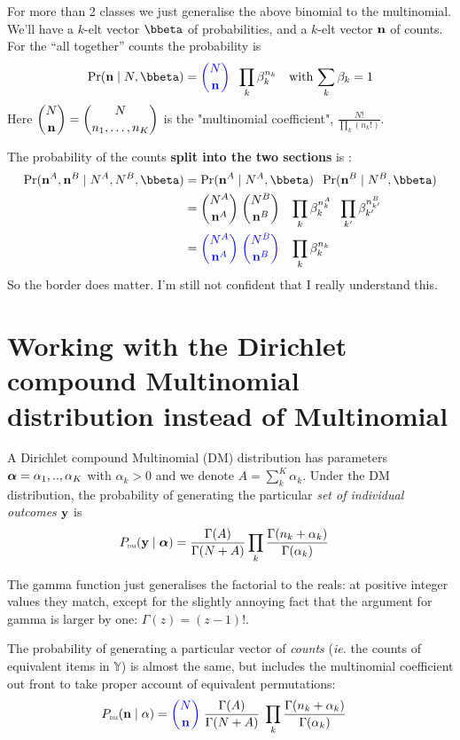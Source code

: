 \documentclass[12pt]{article}
\begin{document}
For more than 2 classes we just generalise the above binomial to the
multinomial.  We'll have a $k$-elt vector $\bbeta$ of probabilities,
and a $k$-elt vector $\mathbf{n}$ of counts.  For the ``all together'' counts
the probability is
\begin{align*}
\Pr(\bn \mid N,\bbeta) &= {\color{blue}{N \choose \bn}} \;\; \prod_k \beta_k^{n_k}
& \text{with $\displaystyle \sum_k \beta_k  = 1$}
\end{align*}
Here $\displaystyle {N \choose \ensuremath{\mathbf{n}}} = {N \choose n_1,\ldots,n_K}
$ is the "multinomial coefficient", $\displaystyle \frac{N!}{\prod_k (n_k!)}$.

The probability of the counts {\bf split into the two sections} is :
\begin{align}
  \Pr(\bn^A, \bn^B\mid N^A,N^B,\bbeta) &= 
  \Pr(\bn^A \mid N^A,\bbeta) \;\;\Pr(\bn^B \mid N^B,\bbeta) \nonumber \\
&= 
{N^A \choose \bn^A}  \; {N^B \choose \bn^B} \;\;\; \prod_k \beta_k^{n^A_k} \;\; \prod_{k^\prime} \beta_{k^\prime}^{n^B_{k^\prime}} \nonumber \\
&= 
{\color{blue} {N^A \choose \bn^A}  \; {N^B \choose \bn^B}} \;\;\; \prod_k \beta_k^{n_k} \label{eq:multinomial-split}
\end{align}
{\color{red} So the border does matter. I'm still not confident that I really understand this.}

\section{Working with the Dirichlet compound Multinomial distribution instead of Multinomial}
A Dirichlet compound Multinomial (DM) distribution has parameters
$\boldsymbol\alpha = \alpha_1,..,\alpha_K$ with $\alpha_k > 0$ and we denote $ A
= \sum_k^K \alpha_k$. Under the DM distribution, the probability of
generating the particular {\it set of individual outcomes}
$\mathbf{y}$ is
\begin{align}
P_\text{\tiny\sc dm}(\mathbf{y} \mid\boldsymbol\alpha) &= \frac{\Gamma(A)}{\Gamma(N+A)} \prod_k \frac{\Gamma(n_k+\alpha_k)}{\Gamma(\alpha_k)}  \label{eq:DMvalues}
\end{align}

The gamma function just generalises the factorial to the reals: at
positive integer values they match, except for the slightly annoying
fact that the argument for gamma is larger by one: $\Gamma(z) =
(z-1)!$.

The probability of generating a particular vector of {\it counts}
({\it ie.} the counts of equivalent items in $\mathbb{Y}$) is almost
the same, but includes the multinomial coefficient out front to take
proper account of equivalent permutations:
\begin{align}
P_\text{\tiny\sc dm}(\mathbf{n} \mid\alpha) &= {\color{blue} {N \choose \ensuremath{\mathbf{n}}}} \;
 \frac{\Gamma(A)}{\Gamma(N+A)} \;\prod_k \frac{\Gamma(n_k+\alpha_k)}{\Gamma(\alpha_k)}  \label{eq:DMcounts}
\end{align}
\end{document}
